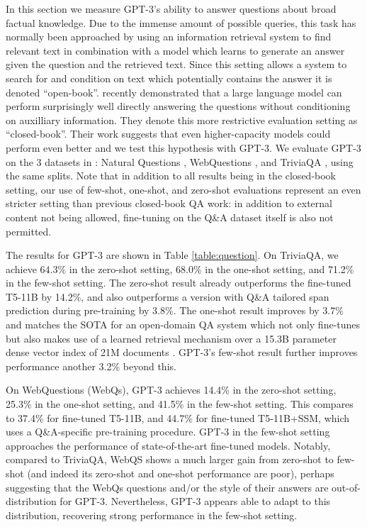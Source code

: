 In this section we measure GPT-3’s ability to answer questions about broad factual knowledge. Due to the immense amount of possible queries, this task has normally been approached by using an information retrieval system to find relevant text in combination with a model which learns to generate an answer given the question and the retrieved text. Since this setting allows a system to search for and condition on text which potentially contains the answer it is denoted ``open-book''. \cite{roberts2020much} recently demonstrated that a large language model can perform surprisingly well directly answering the questions without conditioning on auxilliary information. They denote this more restrictive evaluation setting as ``closed-book''.  Their work suggests that even higher-capacity models could perform even better and we test this hypothesis with GPT-3.   We evaluate GPT-3 on the 3 datasets in \cite{roberts2020much}: Natural Questions \cite{Kwiatkowski2019nq}, WebQuestions \cite{berant2013semantic}, and TriviaQA \cite{joshi2017triviaqa}, using the same splits.  Note that in addition to all results being in the closed-book setting, our use of few-shot, one-shot, and zero-shot evaluations represent an even stricter setting than previous closed-book QA work: in addition to external content not being allowed, fine-tuning on the Q\&A dataset itself is also not permitted.

The results for GPT-3 are shown in Table \ref{table:question}. On TriviaQA, we achieve 64.3\% in the zero-shot setting, 68.0\% in the one-shot setting, and 71.2\% in the few-shot setting.  The zero-shot result already outperforms the fine-tuned T5-11B by 14.2\%, and also outperforms a version with Q\&A tailored span prediction during pre-training by 3.8\%.  The one-shot result improves by 3.7\% and matches the SOTA for an open-domain QA system which not only fine-tunes but also makes use of a learned retrieval mechanism over a 15.3B parameter dense vector index of 21M documents \cite{lewis2020retrieval}. GPT-3's few-shot result further improves performance another 3.2\% beyond this.

On WebQuestions (WebQs), GPT-3 achieves 14.4\% in the zero-shot setting, 25.3\% in the one-shot setting, and 41.5\% in the few-shot setting.  This compares to 37.4\% for fine-tuned T5-11B, and 44.7\% for fine-tuned T5-11B+SSM, which uses a Q\&A-specific pre-training procedure.  GPT-3 in the few-shot setting approaches the performance of state-of-the-art fine-tuned models.  Notably, compared to TriviaQA, WebQS shows a much larger gain from zero-shot to few-shot (and indeed its zero-shot and one-shot performance are poor), perhaps suggesting that the WebQs questions and/or the style of their answers are out-of-distribution for GPT-3.  Nevertheless, GPT-3 appears able to adapt to this distribution, recovering strong performance in the few-shot setting.

